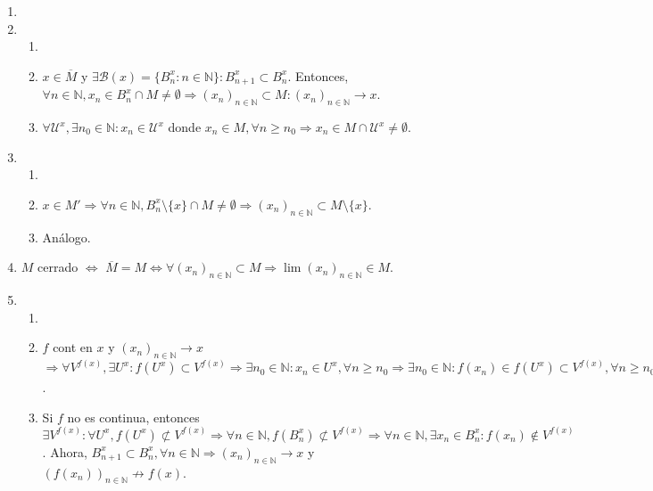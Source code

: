 \begin{dem}
  \begin{enumerate}[label=(\roman*)]
    \item []
    \item
      \begin{enumerate}[label=(\roman*)]
        \item []
        \item [$(\Rightarrow)$] $x \in \overline{M}$ y $\exists \mathcal{B}(x) = \{  B_{n}^{x} :  n \in \mathbb{N} \} : B_{n+1}^{x} \subset B_{n}^{x}$. Entonces, $\forall n \in \mathbb{N}, x_{n} \in B_{n}^{x} \cap M \neq \emptyset \Rightarrow ( x_{n} )_{n \in \mathbb{N}} \subset M : ( x_{n} )_{n \in \mathbb{N}} \rightarrow x$.
        \item [$(\Leftarrow)$] $\forall \mathcal{U}^{x}, \exists n_{0} \in \mathbb{N}: x_{n} \in \mathcal{U}^{x}$ donde $x_{n} \in M , \forall n \geq n_{0} \Rightarrow x_{n} \in M \cap \mathcal{U}^{x} \neq \emptyset$.
      \end{enumerate}
    \item
      \begin{enumerate}[label=(\roman*)]
        \item []
        \item [$(\Rightarrow)$] $x \in M' \Rightarrow \forall n \in \mathbb{N}, B_{n}^{x} \setminus \{ x \} \cap M \neq \emptyset \Rightarrow ( x_{n} )_{n \in \mathbb{N}} \subset M \setminus \{ x \}$.
        \item [$(\Leftarrow)$] Análogo.
      \end{enumerate}
    \item $M$ cerrado $\Leftrightarrow$ $\overline{M} = M \Leftrightarrow \forall ( x_{n} )_{n \in \mathbb{N}} \subset M \Rightarrow \lim ( x_{n} )_{n \in \mathbb{N}} \in M$.
    \item 
      \begin{enumerate}[label=(\roman*)]
        \item []
        \item [$(\Rightarrow)$] $f$ cont en $x$ y $ ( x_{n} )_{n \in \mathbb{N}} \rightarrow x$ $\Rightarrow \forall V^{f(x)}, \exists U^{x} : f(U^{x}) \subset V^{f(x)} \Rightarrow \exists n_{0} \in \mathbb{N} :  x_{n} \in U^{x}, \forall n \geq n_{0} \Rightarrow \exists n_{0} \in \mathbb{N}: f(x_{n}) \in f(U^{x}) \subset V^{f(x)}, \forall n \geq n_{0} \Rightarrow ( f(x_{n}) )_{n \in \mathbb{N}} \rightarrow f(x)$.
        \item [$(\Leftarrow)$] Si $f$ no es continua, entonces $\exists V^{f(x)} : \forall U^{x}, f(U^{x}) \not \subset V^{f(x)} \Rightarrow \forall n \in \mathbb{N}, f(B_{n}^{x}) \not \subset V^{f(x)} \Rightarrow \forall n \in \mathbb{N}, \exists x_{n} \in B_{n}^{x}: f(x_{n}) \not \in V^{f(x)}$. Ahora, $B_{n+1}^{x} \subset B_{n}^{x}, \forall n \in \mathbb{N} \Rightarrow ( x_{n} )_{n \in \mathbb{N}} \rightarrow x$ y $( f(x_{n}) )_{n \in \mathbb{N}} \not \rightarrow f(x)$.
      \end{enumerate}
  \end{enumerate}
\end{dem}

